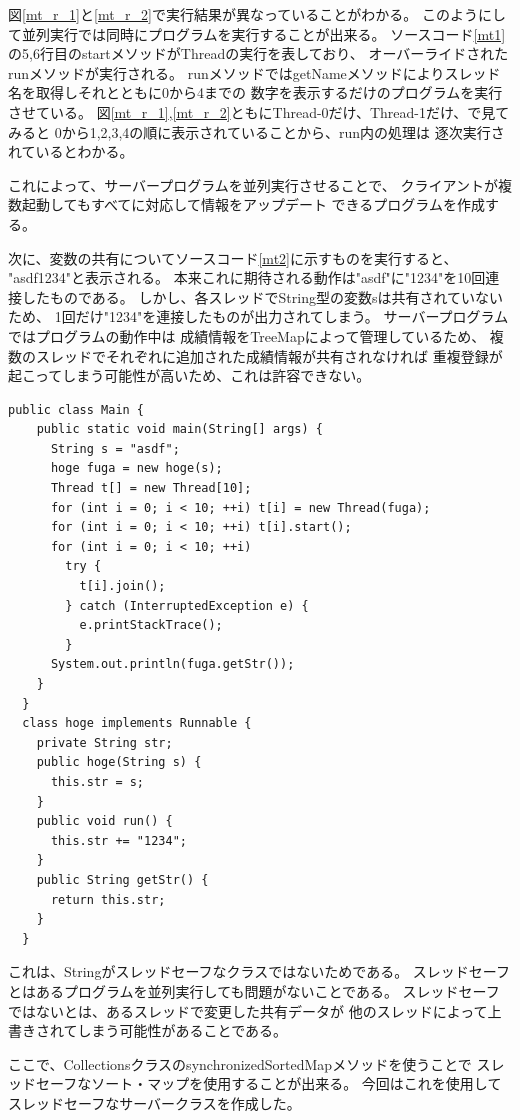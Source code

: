 \documentclass[dvipdfmx]{jsarticle}
\begin{document}
図\ref{mt_r_1}と\ref{mt_r_2}で実行結果が異なっていることがわかる。
このようにして並列実行では同時にプログラムを実行することが出来る。
ソースコード\ref{mt1}の5,6行目のstartメソッドがThreadの実行を表しており、
オーバーライドされたrunメソッドが実行される。
runメソッドではgetNameメソッドによりスレッド名を取得しそれとともに0から4までの
数字を表示するだけのプログラムを実行させている。
図\ref{mt_r_1},\ref{mt_r_2}ともにThread-0だけ、Thread-1だけ、で見てみると
0から1,2,3,4の順に表示されていることから、run内の処理は
逐次実行されているとわかる。

これによって、サーバープログラムを並列実行させることで、
クライアントが複数起動してもすべてに対応して情報をアップデート
できるプログラムを作成する。

次に、変数の共有についてソースコード\ref{mt2}に示すものを実行すると、
"asdf1234"と表示される。
本来これに期待される動作は"asdf"に"1234"を10回連接したものである。
しかし、各スレッドでString型の変数sは共有されていないため、
1回だけ"1234"を連接したものが出力されてしまう。
サーバープログラムではプログラムの動作中は
成績情報をTreeMapによって管理しているため、
複数のスレッドでそれぞれに追加された成績情報が共有されなければ
重複登録が起こってしまう可能性が高いため、これは許容できない。

\begin{lstlisting}[caption=マルチスレッドの例2,label=mt2]
  public class Main {
    public static void main(String[] args) {
      String s = "asdf";
      hoge fuga = new hoge(s);
      Thread t[] = new Thread[10];
      for (int i = 0; i < 10; ++i) t[i] = new Thread(fuga);
      for (int i = 0; i < 10; ++i) t[i].start();
      for (int i = 0; i < 10; ++i)
        try {
          t[i].join();
        } catch (InterruptedException e) {
          e.printStackTrace();
        }
      System.out.println(fuga.getStr());
    }
  }
  class hoge implements Runnable {
    private String str;
    public hoge(String s) {
      this.str = s;
    }
    public void run() {
      this.str += "1234";
    }
    public String getStr() {
      return this.str;
    }
  }
\end{lstlisting}

これは、Stringがスレッドセーフなクラスではないためである。
スレッドセーフとはあるプログラムを並列実行しても問題がないことである。
スレッドセーフではないとは、あるスレッドで変更した共有データが
他のスレッドによって上書きされてしまう可能性があることである。

ここで、CollectionsクラスのsynchronizedSortedMapメソッドを使うことで
スレッドセーフなソート・マップを使用することが出来る。
今回はこれを使用してスレッドセーフなサーバークラスを作成した。
\end{document}
